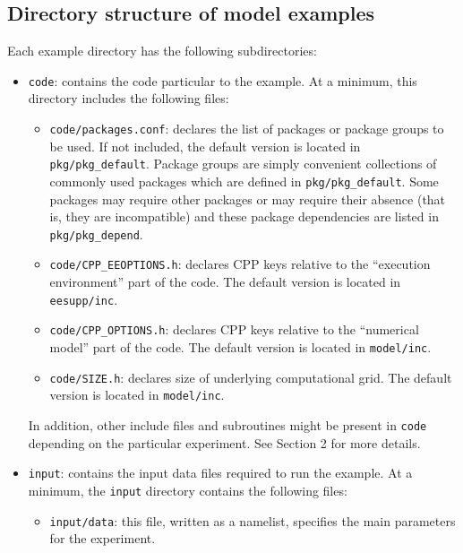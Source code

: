 \subsection{Directory structure of model examples}

Each example directory has the following subdirectories:

\begin{itemize}
\item \texttt{code}: contains the code particular to the example. At a
  minimum, this directory includes the following files:

  \begin{itemize}
  \item \texttt{code/packages.conf}: declares the list of packages or
    package groups to be used.  If not included, the default version
    is located in \texttt{pkg/pkg\_default}.  Package groups are
    simply convenient collections of commonly used packages which are
    defined in \texttt{pkg/pkg\_default}.  Some packages may require
    other packages or may require their absence (that is, they are
    incompatible) and these package dependencies are listed in
    \texttt{pkg/pkg\_depend}.

  \item \texttt{code/CPP\_EEOPTIONS.h}: declares CPP keys relative to
    the ``execution environment'' part of the code. The default
    version is located in \texttt{eesupp/inc}.
  
  \item \texttt{code/CPP\_OPTIONS.h}: declares CPP keys relative to
    the ``numerical model'' part of the code. The default version is
    located in \texttt{model/inc}.
  
  \item \texttt{code/SIZE.h}: declares size of underlying
    computational grid.  The default version is located in
    \texttt{model/inc}.
  \end{itemize}
  
  In addition, other include files and subroutines might be present in
  \texttt{code} depending on the particular experiment. See Section 2
  for more details.
  
\item \texttt{input}: contains the input data files required to run
  the example. At a minimum, the \texttt{input} directory contains the
  following files:

  \begin{itemize}
  \item \texttt{input/data}: this file, written as a namelist,
    specifies the main parameters for the experiment.
  

\end{itemize}
\end{itemize}
